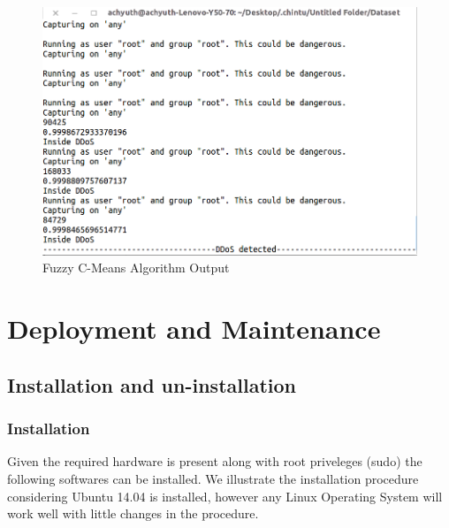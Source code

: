 \documentclass[12pt,a4paper,final]{report}
\begin{document}
\begin{figure}
\centering
\includegraphics[scale=0.4]{FuzzyOutput.png}
\caption{Fuzzy C-Means Algorithm Output}
\end{figure}

\newpage
{}
\chapter{Deployment and Maintenance}
\thispagestyle{empty}
\newpage
\section{Installation and un-installation}
\subsection{Installation}
Given the required hardware is present along with root priveleges (sudo) the following softwares can be installed. We illustrate the installation procedure considering Ubuntu 14.04 is installed, however any Linux Operating System will work well with little changes in the procedure.
\end{document}
